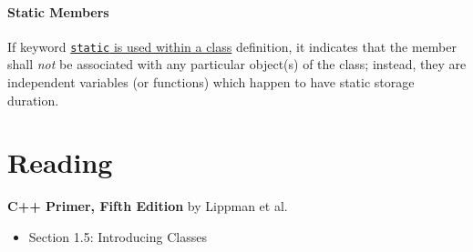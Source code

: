 \documentclass[12pt,letterpaper,twoside]{article}
\begin{document}
\paragraph{Static Members} If keyword 
\href{https://en.cppreference.com/w/cpp/language/static}
{\texttt{static} is used within a class}
definition, it indicates that the member shall \emph{not} be associated
with any particular object(s) of the class; instead, they are independent
variables (or functions) which happen to have static storage duration.

\section{Reading}\label{reading}

\textbf{C++ Primer, Fifth Edition} by Lippman et al.

\begin{itemize}
\item
  Section 1.5: Introducing Classes
\end{itemize}
 
\end{document}
